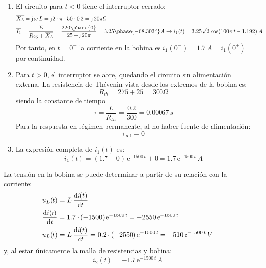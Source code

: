 \begin{enumerate}
    \item El circuito para $t<0$ tiene el interruptor cerrado:
    \begin{align*}
        &\overline{X_L}=\mathrm{j}\,\omega\,L=\mathrm{j}\,2\cdot\pi\cdot 50\cdot 0.2=\mathrm{j}\,20\pi\Omega\\
        &\overline{I_1}=\dfrac{\overline{E}}{R_{25}+\overline{X_L}}=\dfrac{220\phase{0}}{25+\mathrm{j}\,20\pi}=3.25\phase{-68.303^\circ}\,A \rightarrow i_1(t)=3.25\sqrt{2}\,\cos(100\pi\,t-1.192)\,A
    \end{align*}
    Por tanto, en $t=0^-$ la corriente en la bobina es $i_1(0^-)=1.7\,A=i_1(0^+)$ por continuidad.
    \item Para $t>0$, el interruptor se abre, quedando el circuito sin alimentación externa. La resistencia de Thévenin vista desde los extremos de la bobina es:
    \begin{equation*}
        R_{th}=275+25=300\Omega
    \end{equation*}
    siendo la constante de tiempo:
    \begin{equation*}
        \tau=\dfrac{L}{R_{th}}=\dfrac{0.2}{300}=0.00067\,s
    \end{equation*}
    Para la respuesta en régimen permanente, al no haber fuente de alimentación:
    \begin{equation*}
        i_{\infty1}=0
    \end{equation*}
    \item La expresión completa de $i_1(t)$ es:
    \begin{equation*}
        i_1(t)=\left(1.7-0 \right)\,\mathrm{e}^{-1500\,t}+0=1.7\,\mathrm{e}^{-1500\,t}\,A
    \end{equation*}
\end{enumerate}
La tensión en la bobina se puede determinar a partir de su relación con la corriente:
\begin{align*}
    &u_L(t)=L\,\diff{i(t)}{t}\\
    &\diff{i(t)}{t}=1.7\cdot (-1500)\,\mathrm{e}^{-1500\,t}=-2550\,\mathrm{e}^{-1500\,t}\\
    & u_L(t)=L\,\diff{i(t)}{t}=0.2\cdot (-2550)\,\mathrm{e}^{-1500\,t}=-510\,\mathrm{e}^{-1500\,t}\,V
\end{align*}
y, al estar únicamente la malla de resistencias y bobina:
\begin{equation*}
    i_2(t)=-1.7\,\mathrm{e}^{-1500\,t}\,A
\end{equation*}


